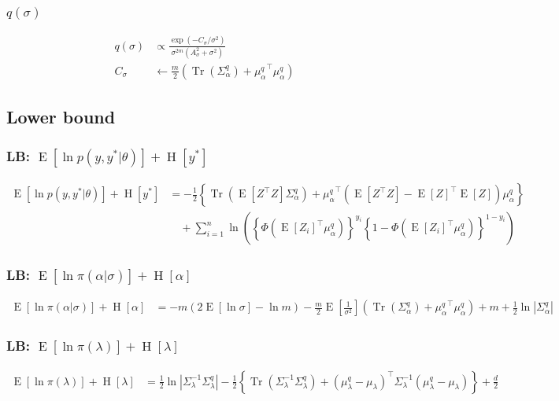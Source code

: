 \documentclass[11pt]{article}
\DeclareMathOperator{\Tr}{Tr}
\newcommand{\opn}{\operatorname}
\begin{document}
\subsubsection{$q\left(\sigma\right)$}
\begin{align*}
  q\left(\sigma\right) &\propto \frac{\exp\left(-C_{\sigma}/\sigma^{2}\right)}{\sigma^{2m}\left(A_{\sigma}^{2}+\sigma^{2}\right)}\\
  C_{\sigma} &\leftarrow \frac{m}{2}\left(\Tr\left(\Sigma_{\alpha}^{q}\right)+{\mu_{\alpha}^{q}}^{\top}\mu_{\alpha}^{q}\right)
\end{align*}
\subsection{Lower bound}
\subsubsection{LB: $\opn{E}\left[\ln p\left(y,y^{*}|\theta\right)\right] + \opn{H}\left[y^{*}\right]$}
\begin{align*}
  \opn{E}\left[\ln p\left(y,y^{*}|\theta\right)\right] + \opn{H}\left[y^{*}\right] &= -\frac{1}{2}\left\{\Tr\left(\opn{E}\left[Z^{\top}Z\right]\Sigma_{\alpha}^{q}\right) +{\mu_{\alpha}^{q}}^{\top}\left(\opn{E}\left[Z^{\top}Z\right]-\opn{E}\left[Z\right]^{\top}\opn{E}\left[Z\right]\right)\mu_{\alpha}^{q} \right\}\\
  &\quad +\sum_{i=1}^{n}\ln\left(\left\{\Phi\left(\opn{E}\left[Z_{i}\right]^{\top}\mu_{\alpha}^{q}\right) \right\}^{y_{i}}\left\{1-\Phi\left(\opn{E}\left[Z_{i}\right]^{\top}\mu_{\alpha}^{q}\right) \right\}^{1-y_{i}} \right)
\end{align*}
\subsubsection{LB: $\opn{E}\left[\ln \pi\left(\alpha|\sigma\right)\right] +\opn{H}\left[\alpha\right]$}
\begin{align*}
  \opn{E}\left[\ln \pi\left(\alpha|\sigma\right)\right] +\opn{H}\left[\alpha\right] &= -m\left(2\opn{E}\left[\ln \sigma\right] -\ln m\right) -\frac{m}{2}\opn{E}\left[\frac{1}{\sigma^{2}}\right]\left(\Tr\left(\Sigma_{\alpha}^{q}\right)+{\mu_{\alpha}^{q}}^{\top}\mu_{\alpha}^{q}\right) +m + \frac{1}{2}\ln\left|\Sigma_{\alpha}^{q}\right|
\end{align*}
\subsubsection{LB: $\opn{E}\left[\ln \pi\left(\lambda\right)\right]+\opn{H}\left[\lambda\right]$}
\begin{align*}
  \opn{E}\left[\ln \pi\left(\lambda\right)\right]+\opn{H}\left[\lambda\right] &= \frac{1}{2}\ln\left|\Sigma_{\lambda}^{-1}\Sigma_{\lambda}^{q}\right| -\frac{1}{2}\left\{\Tr\left(\Sigma_{\lambda}^{-1}\Sigma_{\lambda}^{q}\right) +\left(\mu_{\lambda}^{q}-\mu_{\lambda}\right)^{\top}\Sigma_{\lambda}^{-1}\left(\mu_{\lambda}^{q}-\mu_{\lambda}\right) \right\} + \frac{d}{2}
\end{align*}
\end{document}
